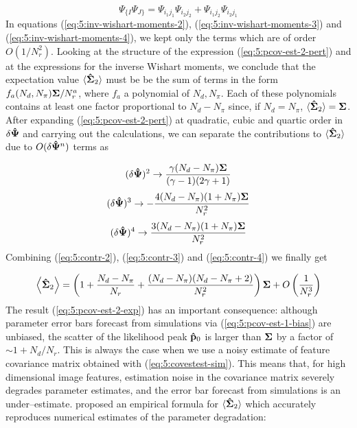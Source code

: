 \begin{equation}
\label{eq:5:symmind}
\Psi_{\{ I}\Psi_{J\}} = \Psi_{i_1j_1}\Psi_{i_2j_2} + \Psi_{i_1j_2}\Psi_{i_2j_1}
\end{equation}  
%
In equations (\ref{eq:5:inv-wishart-moments-2}), (\ref{eq:5:inv-wishart-moments-3}) and (\ref{eq:5:inv-wishart-moments-4}), we kept only the terms which are of order $O(1/N_r^2)$. Looking at the structure of the expression (\ref{eq:5:pcov-est-2-pert}) and at the expressions for the inverse Wishart moments, we conclude that the expectation value $\langle\mathbf{\hat{\Sigma}}_2\rangle$ must be be the sum of terms in the form $f_a(N_d,N_\pi)\mathbf{\Sigma}/N_r^a$, where $f_a$ a polynomial of $N_d,N_\pi$. Each of these polynomials contains at least one factor proportional to $N_d-N_\pi$ since, if $N_d=N_\pi$, $\langle\mathbf{\hat{\Sigma}}_2\rangle=\mathbf{\Sigma}$. After expanding (\ref{eq:5:pcov-est-2-pert}) at quadratic, cubic and quartic order in $\delta\mathbf{\hat{\Psi}}$ and  carrying out the calculations, we can separate the contributions to $\langle\mathbf{\hat{\Sigma}}_2\rangle$ due to $O(\delta\mathbf{\hat{\Psi}}^n)$ terms as

\begin{equation}
\label{eq:5:contr-2}
(\delta\mathbf{\hat{\Psi}})^2 \rightarrow \frac{\gamma(N_d-N_\pi)\mathbf{\Sigma}}{(\gamma-1)(2\gamma+1)}
\end{equation} 
%
\begin{equation}
\label{eq:5:contr-3}
(\delta\mathbf{\hat{\Psi}})^3 \rightarrow -\frac{4(N_d-N_\pi)(1+N_\pi)\mathbf{\Sigma}}{N_r^2}
\end{equation} 
%
\begin{equation}
\label{eq:5:contr-4}
(\delta\mathbf{\hat{\Psi}})^4 \rightarrow \frac{3(N_d-N_\pi)(1+N_\pi)\mathbf{\Sigma}}{N_r^2}
\end{equation} 
%
Combining (\ref{eq:5:contr-2}), (\ref{eq:5:contr-3}) and (\ref{eq:5:contr-4}) we finally get 

\begin{equation}
\label{eq:5:pcov-est-2-exp}
\left\langle\mathbf{\hat{\Sigma}}_2\right\rangle = \left(1+\frac{N_d-N_\pi}{N_r}+\frac{(N_d-N_\pi)(N_d-N_\pi+2)}{N_r^2}\right)\mathbf{\Sigma} + O\left(\frac{1}{N_r^3}\right)
\end{equation} 
%
The result (\ref{eq:5:pcov-est-2-exp}) has an important consequence: although parameter error bars forecast from simulations via (\ref{eq:5:pcov-est-1-bias}) are unbiased, the scatter of the likelihood peak $\mathbf{\hat{p}}_0$ is larger than $\mathbf{\Sigma}$ by a factor of $\sim 1+N_d/N_r$. This is always the case when we use a noisy estimate of feature covariance matrix obtained with (\ref{eq:5:covestest-sim}). This means that, for high dimensional image features, estimation noise in the covariance matrix severely degrades parameter estimates, and the error bar forecast from simulations is an under--estimate. \citep{Taylor14} proposed an empirical formula for $\langle\mathbf{\hat{\Sigma}}_2\rangle$ which accurately reproduces numerical estimates of the parameter degradation:

